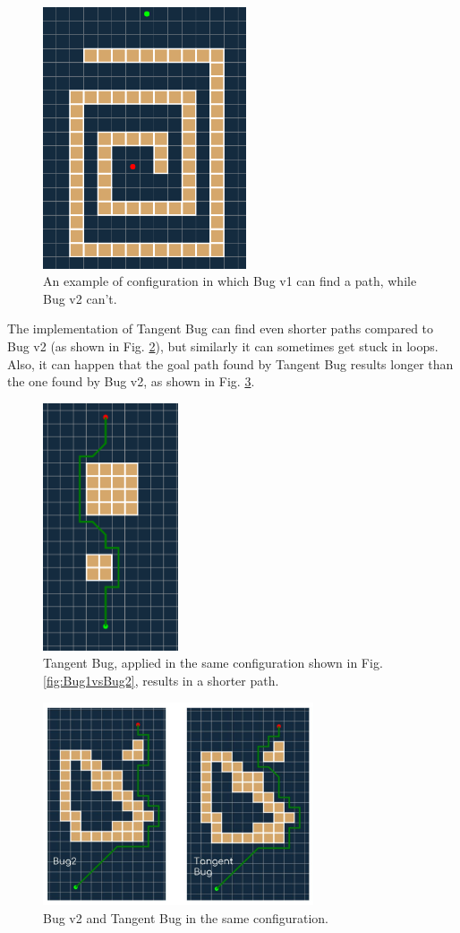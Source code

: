 \documentclass[conference]{IEEEtran}
\begin{document}
\begin{figure}[]
	\includegraphics[width=6cm]{spiral.png}
	\centering
	\caption{An example of configuration in which Bug v1 can find a path, while Bug v2 can't.}
	\label{fig:spiral}
\end{figure}

The implementation of Tangent Bug can find even shorter paths compared to Bug v2 (as shown in Fig. \ref{fig:tgbug}), but similarly it can sometimes get stuck in loops. Also, it can happen that the goal path found by Tangent Bug results longer than the one found by Bug v2, as shown in Fig. \ref{fig:bug2vstgbug}.

\begin{figure}[]
	\includegraphics[width=4cm]{tgbug.png}
	\centering
	\caption{Tangent Bug, applied in the same configuration shown in Fig. \ref{fig:Bug1vsBug2}, results in a shorter path.}
	\label{fig:tgbug}
\end{figure}

\begin{figure}[]
	\includegraphics[width=8cm]{bug2vstgbug.jpg}
	\centering
	\caption{Bug v2 and Tangent Bug in the same configuration.}
	\label{fig:bug2vstgbug}
\end{figure}
\end{document}

